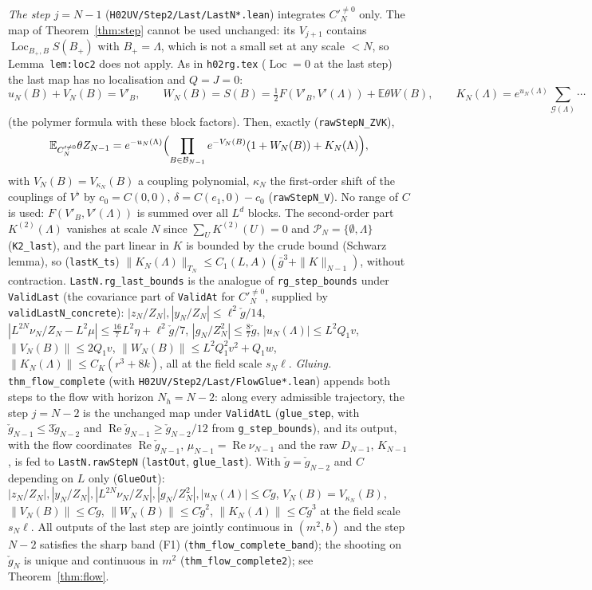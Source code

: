 \documentclass[11pt]{amsart}
\theoremstyle{definition}
\theoremstyle{remark}
\numberwithin{equation}{section}
\newcommand{\E}{\mathbb{E}}
\newcommand{\cB}{\mathcal{B}}
\newcommand{\cP}{\mathcal{P}}
\newcommand{\cW}{W}
\newcommand{\Loc}{\operatorname{Loc}}
\newcommand{\hr}{\texttt{h02rg.tex}}
\begin{document}
\emph{The step $j=N-1$} (\texttt{H02UV/Step2/Last/LastN*.lean}) integrates $C'^{\ne0}_N$ only. The map of
Theorem~\ref{thm:step} cannot be used unchanged: its $V_{j+1}$ contains $\Loc_{B_+,B}S(B_+)$ with
$B_+=\Lambda$, which is not a small set at any scale $<N$, so Lemma~\texttt{lem:loc2} does not apply.
As in \hr{} ($\Loc=0$ at the last step) the last map has no localisation and $Q=J=0$:
\[
  u_N(B)+V_N(B)=V'_B,\qquad \cW_N(B)=S(B)=\tfrac12F(V'_B,V'(\Lambda))+\E\theta\cW(B),
  \qquad K_N(\Lambda)=e^{u_N(\Lambda)}\textstyle\sum_{\mathcal G(\Lambda)}\cdots
\]
(the polymer formula with these block factors). Then, exactly (\texttt{rawStepN\_ZVK}),
\[
  \E_{C'^{\ne0}_N}\theta Z_{N-1}=e^{-u_N(\Lambda)}\Bigl(\prod_{B\in\cB_{N-1}}e^{-V_N(B)}(1+\cW_N(B))
  +K_N(\Lambda)\Bigr),
\]
with $V_N(B)=V_{\kappa_N}(B)$ a coupling polynomial, $\kappa_N$ the first-order shift of the couplings
of $V^\flat$ by $c_0=C(0,0)$, $\delta=C(e_1,0)-c_0$ (\texttt{rawStepN\_V}). No range of $C$ is used:
$F(V'_B,V'(\Lambda))$ is summed over all $L^d$ blocks. The second-order part $K^{(2)}(\Lambda)$ vanishes
at scale $N$ since $\sum_UK^{(2)}(U)=0$ and $\cP_N=\{\emptyset,\Lambda\}$ (\texttt{K2\_last}), and
the part linear in $K$ is bounded by the crude bound (Schwarz lemma), so
(\texttt{lastK\_ts}) $\|K_N(\Lambda)\|_{T_N}\le C_1(L,A)(\bar g^3+\|K\|_{N-1})$, without contraction.
\texttt{LastN.rg\_last\_bounds} is the analogue of \texttt{rg\_step\_bounds} under \texttt{ValidLast}
(the covariance part of \texttt{ValidAt} for $C'^{\ne0}_N$, supplied by \texttt{validLastN\_concrete}):
$|z_N/Z_N|,|y_N/Z_N|\le\ell^2\check g/14$, $|L^{2N}\nu_N/Z_N-L^2\mu|\le\frac{16}{7}L^2\eta+\ell^2\check g/7$,
$|g_N/Z_N^2|\le\frac87\check g$, $|u_N(\Lambda)|\le L^2Q_1v$, $\|V_N(B)\|\le2Q_1v$,
$\|\cW_N(B)\|\le L^2Q_1^2v^2+Q_1w$, $\|K_N(\Lambda)\|\le C_K(r^3+8k)$, all at the field scale $s_N\ell$.
\emph{Gluing.} \texttt{thm\_flow\_complete} (with \texttt{H02UV/Step2/Last/FlowGlue*.lean}) appends both steps to the
flow with horizon $N_h=N-2$: along every admissible trajectory, the step $j=N-2$ is the unchanged map
under \texttt{ValidAtL} (\texttt{glue\_step}, with $\check g_{N-1}\le3\check g_{N-2}$ and
$\operatorname{Re}\check g_{N-1}\ge\check g_{N-2}/12$ from \texttt{g\_step\_bounds}), and its output, with the flow
coordinates $\operatorname{Re}\check g_{N-1}$, $\mu_{N-1}=\operatorname{Re}\nu_{N-1}$ and the raw $D_{N-1}$, $K_{N-1}$, is fed to
\texttt{LastN.rawStepN} (\texttt{lastOut}, \texttt{glue\_last}). With $\check g=\check g_{N-2}$ and
$C$ depending on $L$ only (\texttt{GlueOut}): $|z_N/Z_N|,|y_N/Z_N|,|L^{2N}\nu_N/Z_N|,|g_N/Z_N^2|,
|u_N(\Lambda)|\le C\check g$, $V_N(B)=V_{\kappa_N}(B)$, $\|V_N(B)\|\le C\check g$, $\|\cW_N(B)\|\le C\check g^2$,
$\|K_N(\Lambda)\|\le C\check g^3$ at the field scale $s_N\ell$. All outputs of the last step are jointly
continuous in $(m^2,b)$ and the step $N-2$ satisfies the sharp band (F1) (\texttt{thm\_flow\_complete\_band}); the
shooting on $\check g_N$ is unique and continuous in $m^2$ (\texttt{thm\_flow\_complete2}); see
Theorem~\ref{thm:flow}.
\end{document}
